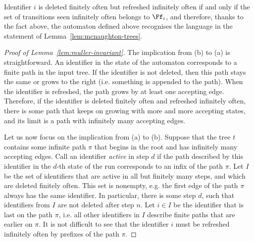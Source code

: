 Identifier $i$ is deleted finitely often but refreshed infinitely often if and only if the set of transitions seen infinitely often belongs to $\Ff_i$, and therefore, thanks to the fact above, the automaton defined above recognises the language in the statement of Lemma~\ref{lem:mcnaughton-trees}. 

\begin{proof}[Proof of Lemma~\ref{lem:muller-invariant}]
The implication from (b) to (a) is straightforward. An identifier in the state of the automaton corresponds to a finite path in the input tree. If the identifier is not deleted, then this path stays the same or grows to the right (i.e. something is appended to the path). When the identifier is refreshed, the path grows by at least one accepting edge. Therefore, if the identifier is deleted finitely often and refreshed infinitely often, there is some path that keeps on growing with more and more accepting states, and its limit is a path with infinitely many accepting edges.

Let us now focus on the implication from (a) to (b). Suppose that the tree $t$ contains some infinite path $\pi$ that begins in the root and has infinitely many accepting edges. Call an identifier \emph{active} in step $d$ if the path described by this identifier in the $d$-th state of the run corresponds to an infix of the path $\pi$. Let $I$ be the set of identifiers that are active in all but finitely many steps, and which are deleted finitely often. This set is nonempty, e.g. the first edge of the path $\pi$  always has the same identifier. In particular, there is some step $d$, such that identifiers from $I$ are not deleted after step $n$. Let $i \in I$ be the identifier that is last on the path $\pi$, i.e. all other identifiers in $I$ describe finite paths that are earlier on $\pi$. It is not difficult to see that the identifier $i$ must be refreshed infinitely often by prefixes of the path $\pi$.
\end{proof}



